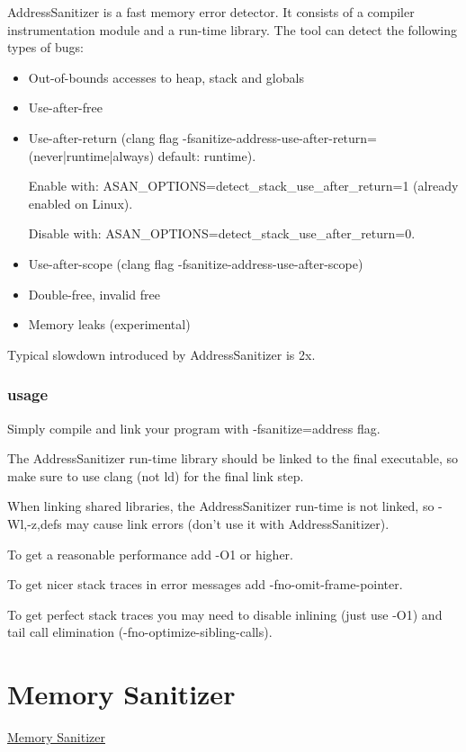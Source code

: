 AddressSanitizer is a fast memory error detector. It consists of a compiler instrumentation module and a run-time library. The tool can detect the following types of bugs:

\begin{itemize}
  \item Out-of-bounds accesses to heap, stack and globals
  \item Use-after-free
  \item Use-after-return (clang flag -fsanitize-address-use-after-return=(never|runtime|always) default: runtime).


    Enable with: ASAN\_OPTIONS=detect\_stack\_use\_after\_return=1 (already enabled on Linux).


    Disable with: ASAN\_OPTIONS=detect\_stack\_use\_after\_return=0.
  \item Use-after-scope (clang flag -fsanitize-address-use-after-scope)
  \item Double-free, invalid free
  \item Memory leaks (experimental)
\end{itemize}

Typical slowdown introduced by AddressSanitizer is 2x.

\subsubsection{usage}%
\label{ssub:usage}
Simply compile and link your program with -fsanitize=address flag. 

The AddressSanitizer run-time library should be linked to the final executable, so make sure to use clang (not ld) for the final link step.

When linking shared libraries, the AddressSanitizer run-time is not linked, so -Wl,-z,defs may cause link errors (don’t use it with AddressSanitizer).

To get a reasonable performance add -O1 or higher.

To get nicer stack traces in error messages add -fno-omit-frame-pointer.

To get perfect stack traces you may need to disable inlining (just use -O1) and tail call elimination (-fno-optimize-sibling-calls).

\section{Memory Sanitizer}%
\label{sec:memory_sanitizer}
\href{https://clang.llvm.org/docs/MemorySanitizer.html}{Memory Sanitizer}

